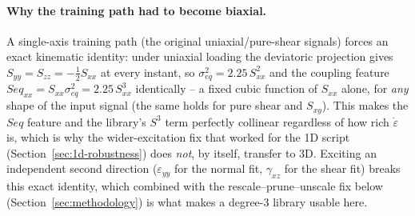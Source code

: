 \documentclass{article}
\begin{document}
\paragraph{Why the training path had to become biaxial.} A single-axis training path (the original uniaxial/pure-shear signals) forces an exact kinematic identity: under uniaxial loading the deviatoric projection gives $S_{yy}=S_{zz}=-\tfrac12 S_{xx}$ at every instant, so $\sigma_{eq}^2 = 2.25\,S_{xx}^2$ and the coupling feature $Seq_{xx}=S_{xx}\sigma_{eq}^2 = 2.25\,S_{xx}^3$ identically -- a fixed cubic function of $S_{xx}$ alone, for \emph{any} shape of the input signal (the same holds for pure shear and $S_{xy}$). This makes the $Seq$ feature and the library's $S^3$ term perfectly collinear regardless of how rich $\dot\varepsilon$ is, which is why the wider-excitation fix that worked for the 1D script (Section~\ref{sec:1d-robustness}) does \emph{not}, by itself, transfer to 3D. Exciting an independent second direction ($\varepsilon_{yy}$ for the normal fit, $\gamma_{xz}$ for the shear fit) breaks this exact identity, which combined with the rescale--prune--unscale fix below (Section~\ref{sec:methodology}) is what makes a degree-3 library usable here.
\end{document}
